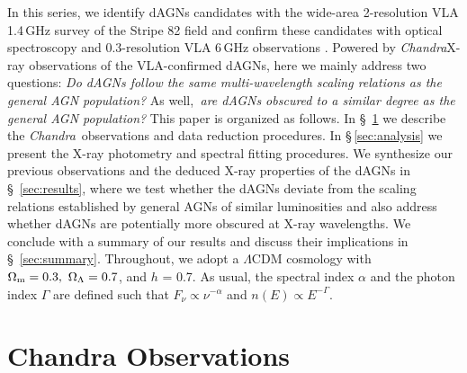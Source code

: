 \documentclass[iop,revtex4,twocolumn,apj,numberedappendix,appendixfloats]{emulateapj}
\newcommand{\chandra}{{\it Chandra}}
\begin{document}
In this series, we identify dAGNs candidates with the wide-area 2\arcsec-resolution VLA 1.4\,GHz survey of the Stripe 82 field \citep[][hereafter ]{Fu15a} and confirm these candidates with optical spectroscopy and 0.3\arcsec-resolution VLA 6\,GHz observations \citep[][hereafter ]{Fu15b}. Powered by \chandra X-ray observations of the VLA-confirmed dAGNs, here we mainly address two questions: {\it Do dAGNs follow the same multi-wavelength scaling relations as the general AGN population?} As well,{\it \, are dAGNs obscured to a similar degree as the general AGN population?} 
%
This paper is organized as follows. In \S~\ref{sec:obs} we describe the \chandra\ observations and data reduction procedures. In \S\,\ref{sec:analysis} we present the X-ray photometry and spectral fitting procedures. We synthesize our previous observations and the deduced X-ray properties of the dAGNs in \S~\ref{sec:results}, where we test whether the dAGNs deviate from the scaling relations established by general AGNs of similar luminosities and also address whether dAGNs are potentially more obscured at X-ray wavelengths.  
We conclude with a summary of our results and discuss their implications in \S~\ref{sec:summary}.
%
Throughout, we adopt a $\Lambda$CDM cosmology with $\Omega_{\rm m} = 0.3, \ \Omega_{\Lambda} = 0.7$, and $h$ = 0.7. As usual, the spectral index $\alpha$ and the photon index $\Gamma$ are defined such that $F_\nu \propto \nu^{-\alpha}$ and $n(E) \propto E^{-\Gamma}$.


\section{Chandra Observations} \label{sec:obs}
\end{document}
